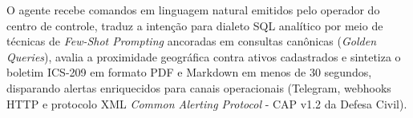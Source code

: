 O agente recebe comandos em linguagem natural emitidos pelo operador do centro de controle, traduz a intenção para dialeto SQL analítico por meio de técnicas de \textit{Few-Shot Prompting} ancoradas em consultas canônicas (\textit{Golden Queries}), avalia a proximidade geográfica contra ativos cadastrados e sintetiza o boletim ICS-209 em formato PDF e Markdown em menos de 30 segundos, disparando alertas enriquecidos para canais operacionais (Telegram, webhooks HTTP e protocolo XML \textit{Common Alerting Protocol} - CAP v1.2 da Defesa Civil).
